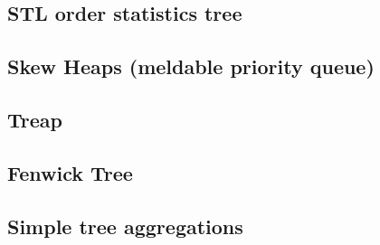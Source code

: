 %


%

\subsection{STL order statistics tree}


\subsection{Skew Heaps (meldable priority queue)}


\subsection{Treap}


\subsection{Fenwick Tree}


\subsection{Simple tree aggregations}

%

%

